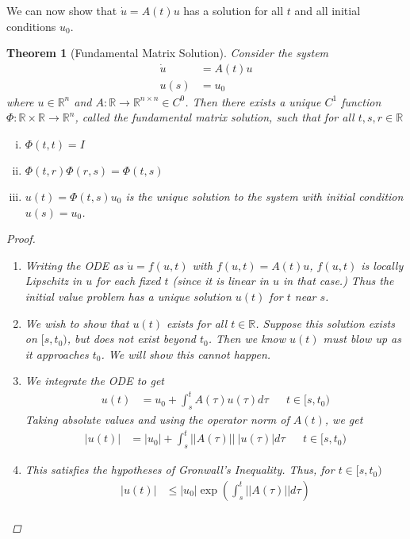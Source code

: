 \documentclass{article}
\newtheorem{theorem}{Theorem}[section]
\def\R{{\mathbb R}}
\begin{document}
We can now show that $\dot{u} = A(t) u$ has a solution for all $t$ and all initial conditions $u_0$.\\

\begin{theorem}[Fundamental Matrix Solution]
Consider the system
\begin{align*}
\dot{u} &= A(t) u \\
u(s) &= u_0
\end{align*}
where $u \in \R^n$ and $A:\R \rightarrow \R^{n \times n} \in C^0$. Then there exists a unique $C^1$ function $\Phi: \R \times \R \rightarrow \R^n$, called the \emph{fundamental matrix solution}, such that for all $t, s, r \in \R$
\begin{enumerate}[(i)]
\item $\Phi(t, t) = I$ \\
\item $\Phi(t, r)\Phi(r, s) = \Phi(t,s)$
\item $u(t) = \Phi(t, s)u_0$ is the unique solution to the system with initial condition $u(s) = u_0$.
\end{enumerate}
\begin{proof}
\begin{enumerate}
\item Writing the ODE as $\dot{u} = f(u, t)$ with $f(u,t) = A(t) u$, $f(u, t)$ is locally Lipschitz in $u$ for each fixed $t$ (since it is linear in $u$ in that case.) Thus the initial value problem has a unique solution $u(t)$ for $t$ near $s$. 
\item We wish to show that $u(t)$ exists for all $t \in \R$. Suppose this solution exists on $[s, t_0)$, but does not exist beyond $t_0$. Then we know $u(t)$ must blow up as it approaches $t_0$. We will show this cannot happen.
\item We integrate the ODE to get
\begin{align*}
u(t) &= u_0 + \int_s^t A(\tau)u(\tau)d\tau && t \in [s, t_0)
\end{align*}
Taking absolute values and using the operator norm of $A(t)$, we get
\begin{align*}
|u(t)| &= |u_0| + \int_s^t ||A(\tau)||\:|u(\tau)|d\tau && t \in [s, t_0)
\end{align*}
\item This satisfies the hypotheses of Gronwall's Inequality. Thus, for $t \in [s, t_0)$
\begin{align*}
|u(t)| &\leq |u_0| \exp \left( \int_s^t ||A(\tau)|| d\tau \right) \\

\end{align*}
\end{enumerate}
\end{proof}
\end{theorem}
\end{document}
